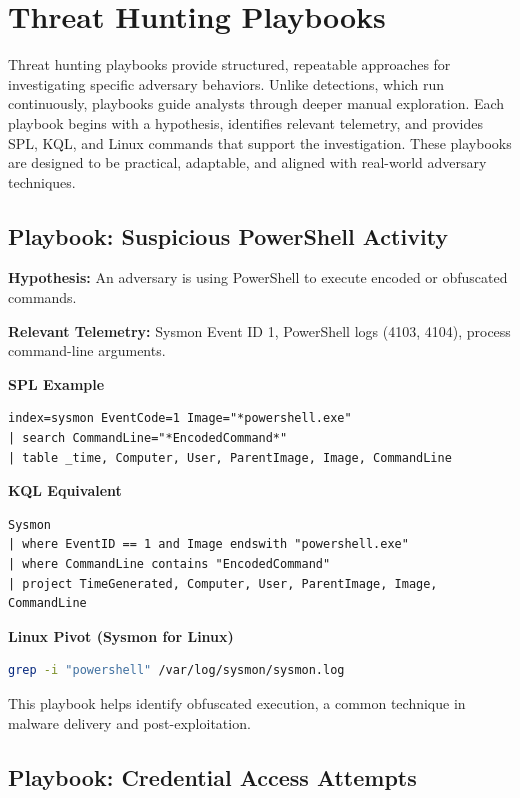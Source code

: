 \section{Threat Hunting Playbooks}

Threat hunting playbooks provide structured, repeatable approaches for investigating specific adversary behaviors. 
Unlike detections, which run continuously, playbooks guide analysts through deeper manual exploration. 
Each playbook begins with a hypothesis, identifies relevant telemetry, and provides SPL, KQL, and Linux commands that 
support the investigation. These playbooks are designed to be practical, adaptable, and aligned with real-world adversary techniques.

\subsection*{Playbook: Suspicious PowerShell Activity}

\textbf{Hypothesis:} An adversary is using PowerShell to execute encoded or obfuscated commands.

\textbf{Relevant Telemetry:} Sysmon Event ID 1, PowerShell logs (4103, 4104), process command-line arguments.

\textbf{SPL Example}
\begin{lstlisting}
index=sysmon EventCode=1 Image="*powershell.exe"
| search CommandLine="*EncodedCommand*"
| table _time, Computer, User, ParentImage, Image, CommandLine
\end{lstlisting}

\textbf{KQL Equivalent}
\begin{lstlisting}
Sysmon
| where EventID == 1 and Image endswith "powershell.exe"
| where CommandLine contains "EncodedCommand"
| project TimeGenerated, Computer, User, ParentImage, Image, CommandLine
\end{lstlisting}

\textbf{Linux Pivot (Sysmon for Linux)}
\begin{lstlisting}[language=bash]
grep -i "powershell" /var/log/sysmon/sysmon.log
\end{lstlisting}

This playbook helps identify obfuscated execution, a common technique in malware delivery and post-exploitation.

\subsection*{Playbook: Credential Access Attempts}

